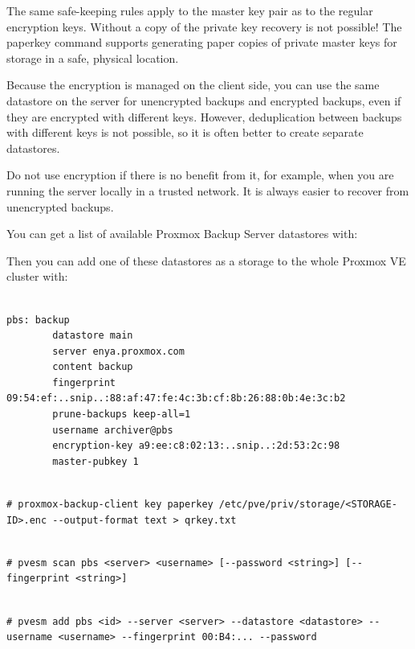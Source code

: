 The same safe-keeping rules apply to the master key pair as to the regular encryption keys. Without a copy of the private key recovery is not possible! The paperkey command supports generating paper copies of private master keys for storage in a safe, physical location.

Because the encryption is managed on the client side, you can use the same datastore on the server for unencrypted backups and encrypted backups, even if they are encrypted with different keys. However, deduplication between backups with different keys is not possible, so it is often better to create separate datastores.

Do not use encryption if there is no benefit from it, for example, when you are running the server locally in a trusted network. It is always easier to recover from unencrypted backups.

You can get a list of available Proxmox Backup Server datastores with:

Then you can add one of these datastores as a storage to the whole Proxmox VE cluster with:

\begin{lstlisting}

pbs: backup
        datastore main
        server enya.proxmox.com
        content backup
        fingerprint 09:54:ef:..snip..:88:af:47:fe:4c:3b:cf:8b:26:88:0b:4e:3c:b2
        prune-backups keep-all=1
        username archiver@pbs
        encryption-key a9:ee:c8:02:13:..snip..:2d:53:2c:98
        master-pubkey 1

\end{lstlisting}

\begin{lstlisting}

# proxmox-backup-client key paperkey /etc/pve/priv/storage/<STORAGE-ID>.enc --output-format text > qrkey.txt

\end{lstlisting}

\begin{lstlisting}

# pvesm scan pbs <server> <username> [--password <string>] [--fingerprint <string>]

\end{lstlisting}

\begin{lstlisting}

# pvesm add pbs <id> --server <server> --datastore <datastore> --username <username> --fingerprint 00:B4:... --password

\end{lstlisting}

